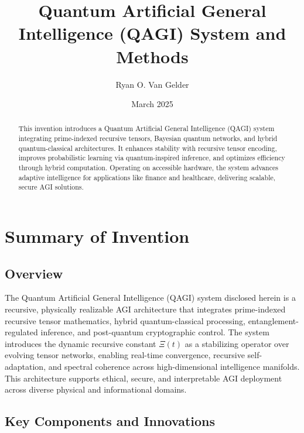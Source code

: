 \documentclass{article}
\theoremstyle{plain}
\theoremstyle{claimstyle}
\begin{document}
\title{Quantum Artificial General Intelligence (QAGI) System and Methods}

\author{Ryan O. Van Gelder}

\date{March 2025}



\maketitle
\nolinenumbers

\begin{abstract}
This invention introduces a Quantum Artificial General Intelligence (QAGI) system integrating prime-indexed recursive tensors, Bayesian quantum networks, and hybrid quantum-classical architectures. It enhances stability with recursive tensor encoding, improves probabilistic learning via quantum-inspired inference, and optimizes efficiency through hybrid computation. Operating on accessible hardware, the system advances adaptive intelligence for applications like finance and healthcare, delivering scalable, secure AGI solutions.
\end{abstract}

\newpage
\linenumbers
\section{Summary of Invention}

\subsection{Overview}

The Quantum Artificial General Intelligence (QAGI) system disclosed herein is a recursive, physically realizable AGI architecture that integrates prime-indexed recursive tensor mathematics, hybrid quantum-classical processing, entanglement-regulated inference, and post-quantum cryptographic control. The system introduces the dynamic recursive constant \( \Xi(t) \) as a stabilizing operator over evolving tensor networks, enabling real-time convergence, recursive self-adaptation, and spectral coherence across high-dimensional intelligence manifolds. This architecture supports ethical, secure, and interpretable AGI deployment across diverse physical and informational domains.

\subsection{Key Components and Innovations}
\end{document}
